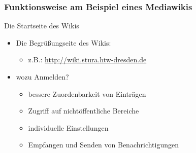 \documentclass{beamer}              %
\begin{document}
\begin{frame}
  \frametitle{Funktionsweise am Beispiel eines Mediawikis}{Die Startseite des Wikis}

  \begin{itemize}[<+->]
    \item Die Begrüßungseite des Wikis:
    \begin{itemize}
      \item z.B.: \url{http://wiki.stura.htw-dresden.de}
    \end{itemize}
    \item wozu Anmelden?
    \begin{itemize}
      \item bessere Zuordenbarkeit von Einträgen
      \item Zugriff auf nichtöffentliche Bereiche
      \item individuelle Einstellungen
      \item Empfangen und Senden von Benachrichtigungen
    \end{itemize}
  \end{itemize}
\end{frame}
\end{document}
